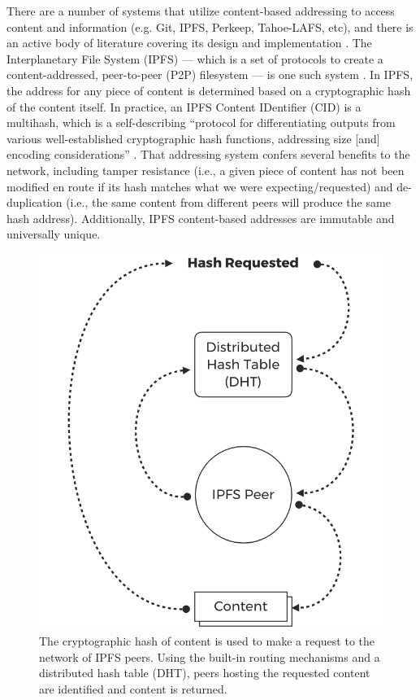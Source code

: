 \documentclass{textile}
\begin{document}
There are a number of systems that utilize content-based addressing to access content and information (e.g. Git, IPFS, Perkeep, Tahoe-LAFS, etc), and there is an active body of literature covering its design and implementation \cite{benetIPFSContentAddressed2014,selimi_tahoeLafs_2014,rhea_fast_2008}. The Interplanetary File System (IPFS) --- which is a set of protocols to create a content-addressed, peer-to-peer (P2P) filesystem --- is one such system \cite{benetIPFSContentAddressed2014}. In IPFS, the address for any piece of content is determined based on a cryptographic hash of the content itself. In practice, an IPFS Content IDentifier (CID) is a multihash, which is a self-describing ``protocol for differentiating outputs from various well-established cryptographic hash functions, addressing size [and] encoding considerations'' \cite{protocollabsMultihash}. That addressing system confers several benefits to the network, including tamper resistance (i.e., a given piece of content has not been modified en route if its hash matches what we were expecting/requested) and de-duplication (i.e., the same content from different peers will produce the same hash address). Additionally, IPFS content-based addresses are immutable and universally unique.

\begin{figure}
  \includegraphics[width=\linewidth]{figures/Hash_Request.png}
  \caption{The cryptographic hash of content is used to make a request to the network of IPFS peers. Using the built-in routing mechanisms and a distributed hash table (DHT), peers hosting the requested content are identified and content is returned.}
  \label{fig:contentaddressing}
\end{figure}
\end{document}
